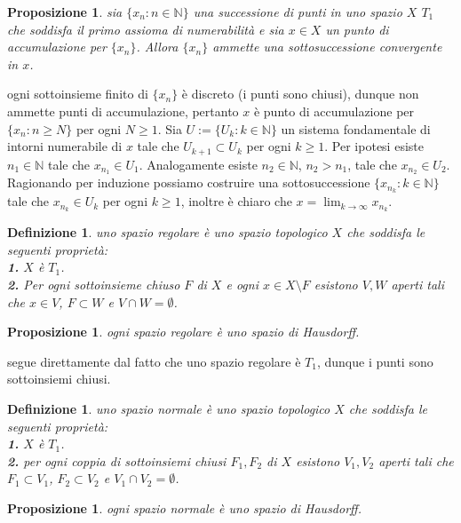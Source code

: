 \documentclass[oneside, 11pt]{amsbook}
\makeatletter
\newcommand{\0}{{(0)}}
\newcommand{\3}{{(3)}}
\theoremstyle{colonplain}
\newtheorem{prop}[thm]{Proposizione}
\theoremstyle{colondefinition}
\newtheorem{defn}[thm]{Definizione}
\theoremstyle{colonremark}
\numberwithin{equation}{chapter}
\renewcommand{\proofname}{Dimostrazione}
\renewenvironment{proof}[1][\proofname]{\par
  \pushQED{\qed}%
  \normalfont \topsep6\p@\@plus6\p@\relax
  \trivlist
  \item[\hskip\labelsep\bfseries #1:]\ignorespaces
}{%
  \popQED\endtrivlist\@endpefalse
}
\makeatother
\begin{document}
\begin{prop}\label{SeqAccPtT1}
sia $\{ x_n : n \in \mathbb{N} \}$ una successione di punti in uno spazio $X$ $T_1$ che soddisfa il primo assioma di numerabilità e sia $x \in X$ un punto di accumulazione per $\{ x_n \}$. Allora $\{ x_n \}$ ammette una sottosuccessione convergente in $x$.
\end{prop}
\begin{proof}
ogni sottoinsieme finito di $\{ x_n \}$ è discreto (i punti sono chiusi), dunque non ammette punti di accumulazione, pertanto $x$ è punto di accumulazione per $\{ x_n : n \geq N \}$ per ogni $N \geq 1$. Sia $U := \{ U_k : k \in \mathbb{N} \}$ un sistema fondamentale di intorni numerabile di $x$ tale che $U_{k + 1} \subset U_k$ per ogni $k \geq 1$. Per ipotesi esiste $n_1 \in \mathbb{N}$ tale che $x_{n_1} \in U_1$. Analogamente esiste $n_2 \in \mathbb{N}$, $n_2 > n_1$, tale che $x_{n_2} \in U_2$. Ragionando per induzione possiamo costruire una sottosuccessione $\{ x_{n_k} : k \in \mathbb{N} \}$ tale che $x_{n_k} \in U_k$ per ogni $k \geq 1$, inoltre è chiaro che $x = \lim_{k \rightarrow \infty} x_{n_k}$.
\end{proof}
\begin{defn}
uno spazio \textit{regolare} è uno spazio topologico $X$ che soddisfa le seguenti proprietà: \\
\textbf{1.} $X$ è $T_1$. \\
\textbf{2.} Per ogni sottoinsieme chiuso $F$ di $X$ e ogni $x \in X \setminus F$ esistono $V, W$ aperti tali che $x \in V$, $F \subset W$ e $V \cap W = \emptyset$.
\end{defn}
\begin{prop}
ogni spazio regolare è uno spazio di Hausdorff.
\end{prop}
\begin{proof}
segue direttamente dal fatto che uno spazio regolare è $T_1$, dunque i punti sono sottoinsiemi chiusi.
\end{proof}
\begin{defn}
uno spazio \textit{normale} è uno spazio topologico $X$ che soddisfa le seguenti proprietà: \\
\textbf{1.} $X$ è $T_1$. \\
\textbf{2.} per ogni coppia di sottoinsiemi chiusi $F_1, F_2$ di $X$ esistono $V_1, V_2$ aperti tali che $F_1 \subset V_1$, $F_2 \subset V_2$ e $V_1 \cap V_2 = \emptyset$.
\end{defn}
\begin{prop}
ogni spazio normale è uno spazio di Hausdorff.
\end{prop}
\end{document}
